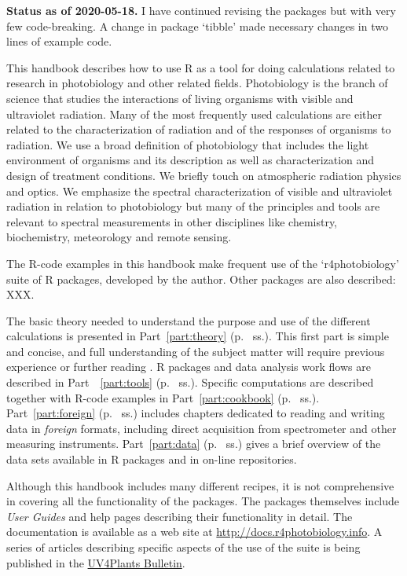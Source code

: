 \begin{shaded}
\noindent
\textbf{Status as of 2020-05-18.} I have continued revising the packages but with very few code-breaking. A change in package `tibble' made necessary changes in two lines of example code.
\end{shaded}

This handbook describes how to use R as a tool for doing calculations related to research in photobiology and other related fields. Photobiology is the branch of science that studies the interactions of living organisms with visible and ultraviolet radiation. Many of the most frequently used calculations are either related to the characterization of radiation and of the responses of organisms to radiation. We use a broad definition of photobiology that includes the light environment of organisms and its description as well as characterization and design of treatment conditions. We briefly touch on atmospheric radiation physics and optics. We emphasize the spectral characterization of visible and ultraviolet radiation in relation to photobiology but many of the principles and tools are relevant to spectral measurements in other disciplines like chemistry, biochemistry, meteorology and remote sensing.

The R-code examples in this handbook make frequent use of the `r4photobiology' suite of R packages, developed by the author. Other packages are also described: XXX.

The basic theory needed to understand the purpose and use of the different calculations is presented in Part~\ref{part:theory} (p.~\pageref{part:theory} ss.). This first part is simple and concise, and full understanding of the subject matter will require previous experience or further reading \autocite[e.g.][]{Aphalo2012,Bjoern2015}.
R packages and data analysis work flows are described in Part~~\ref{part:tools} (p.~\pageref{part:tools} ss.). 
Specific computations are described together with R-code examples in Part~\ref{part:cookbook} (p.~\pageref{part:cookbook} ss.). 
Part~\ref{part:foreign} (p.~\pageref{part:foreign} ss.) includes chapters dedicated to reading and writing data in \emph{foreign} formats, including direct acquisition from spectrometer and other measuring instruments. Part~\ref{part:data} (p.~\pageref{part:data} ss.) gives a brief overview of the data sets available in R packages and in on-line repositories.

Although this handbook includes many different recipes, it is not comprehensive in covering all the functionality of the packages. The packages themselves include \emph{User Guides} and help pages describing their functionality in detail. The documentation is available as a web site at \url{http://docs.r4photobiology.info}. A series of articles describing specific aspects of the use of the suite is being published in the \href{http://uv4plants.org/publications/uv4plants-bulletin-published-issues/}{UV4Plants Bulletin}.

